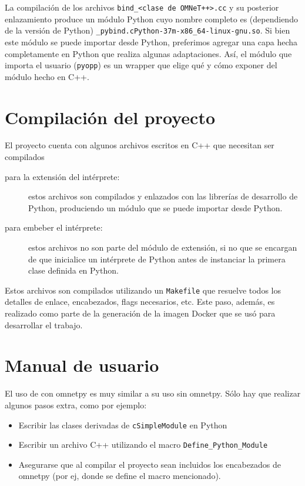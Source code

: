 La compilación de los archivos \verb!bind_<clase de OMNeT++>.cc! y su posterior
enlazamiento produce un módulo Python cuyo nombre completo es (dependiendo de
la versión de Python) \verb!_pybind.cPython-37m-x86_64-linux-gnu.so!. Si bien
este módulo se puede importar desde Python, preferimos agregar una capa hecha
completamente en Python que realiza algunas adaptaciones. Así, el módulo que
importa el usuario (\verb!pyopp!) es un wrapper que elige qué y cómo exponer
del módulo hecho en C++.

\section{Compilación del proyecto}

El proyecto cuenta con algunos archivos escritos en C++ que necesitan ser
compilados

\begin{description}
    \item[para la extensión del intérprete:] estos archivos son compilados y
enlazados con las librerías de desarrollo de Python, produciendo un módulo que
se puede importar desde Python.

    \item[para embeber el intérprete:] estos archivos no son parte del módulo
de extensión, si no que se encargan de que \omnetpp{} inicialice un intérprete
de Python antes de instanciar la primera clase definida en Python.
\end{description}

Estos archivos son compilados utilizando un \verb!Makefile! que resuelve todos
los detalles de enlace, encabezados, flags necesarios, etc. Este paso, además,
es realizado como parte de la generación de la imagen Docker que se usó para
desarrollar el trabajo.

\section{Manual de usuario}

El uso de \omnetpp{} con omnetpy es muy similar a su uso sin omnetpy. Sólo hay que
realizar algunos pasos extra, como por ejemplo:

\begin{itemize}
    \item Escribir las clases derivadas de \verb!cSimpleModule! en Python

    \item Escribir un archivo C++ utilizando el macro
\verb!Define_Python_Module!

    \item Asegurarse que al compilar el proyecto sean incluidos los encabezados
de omnetpy (por ej, donde se define el macro mencionado).
\end{itemize}

